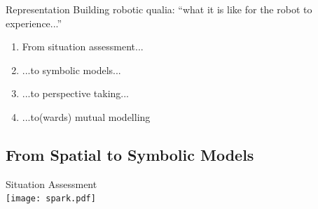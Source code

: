\documentclass[compress]{beamer}
\begin{document}


\begin{frame}{Representation}
    Building robotic qualia: ``what it is like for the robot to experience...''
    \begin{enumerate}
        \item From situation assessment...
        \item ...to symbolic models...
        \item ...to perspective taking...
        \item ...to(wards) mutual modelling
   \end{enumerate}

\end{frame}


\subsection{From Spatial to Symbolic Models}
\begin{frame}{Situation Assessment}
        \centering
        \\
        \vspace*{1em}
        \texttt{[image: spark.pdf]}

\end{frame}
\end{document}
